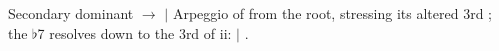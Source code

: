 \begin{patternbox}{Secondary dominant  $\to$ }{ $|$ }
Arpeggio of  from the root, stressing its altered 3rd ;
the $\flat$7 resolves down to the 3rd of ii:
 $|$ .
\patternwhereline
\end{patternbox}
